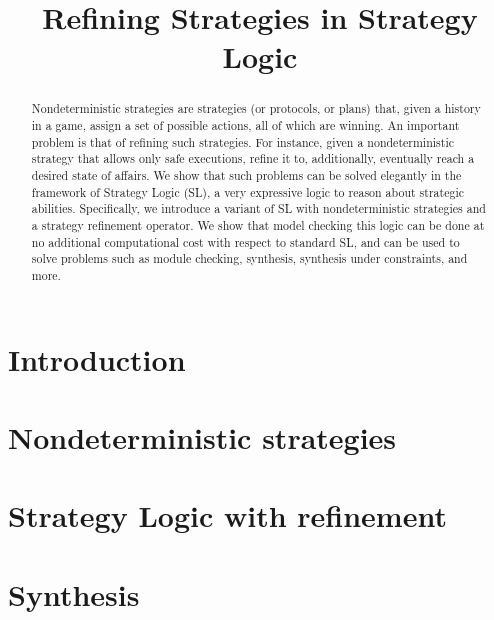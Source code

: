 \documentclass{article}
\title{Refining Strategies in Strategy Logic}
\author{
%
%
%
}
\theoremstyle{definition}
\theoremstyle{plain}
\begin{document}
\maketitle

\begin{abstract}
  Nondeterministic strategies are strategies (or protocols, or plans)
  that, given a history in a game, assign a set of possible actions,
  all of which are winning.  An important problem is that of
  refining such strategies. For instance, given a nondeterministic strategy that allows
only safe executions, 
 refine it to, additionally, eventually reach a desired state of affairs. We show that such problems can
  be solved elegantly in the framework of Strategy Logic (SL), a very
  expressive logic to reason about strategic abilities. Specifically, we
  introduce a variant of SL with nondeterministic strategies 
 and a strategy refinement operator. We 
  show that model checking this logic can be done at 
no additional  computational cost with respect to standard SL, and can
be used to solve problems such as module checking, synthesis,
synthesis under constraints, and more.
\end{abstract}

\section{Introduction}
\label{section:introduction}


\section{Nondeterministic strategies}
\label{section:refinement}





\section{Strategy Logic with refinement}
\label{section:SL}


% 


\section{Synthesis}
\label{section:synthesis}

\end{document}
